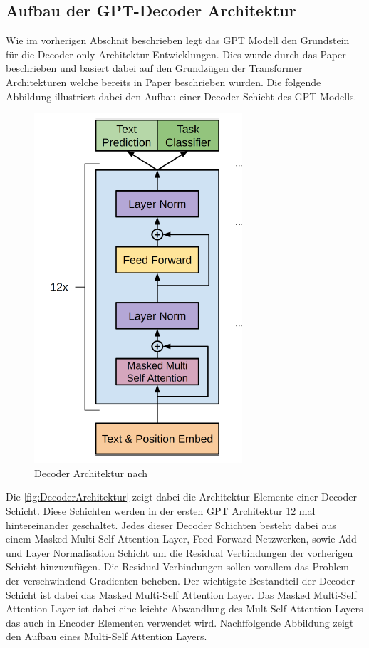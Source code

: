 \documentclass[conference]{IEEEtran}
\begin{document}
\subsection{Aufbau der GPT-Decoder Architektur}
Wie im vorherigen Abschnit beschrieben legt das GPT Modell den Grundstein für die Decoder-only Architektur Entwicklungen. Dies wurde durch das Paper \cite{radfordImprovingLanguageUnderstanding} beschrieben und basiert dabei auf den Grundzügen der Transformer Architekturen welche bereits in Paper \cite{vaswaniAttentionAllYou2023} beschrieben wurden. Die 
folgende Abbildung illustriert dabei den Aufbau einer Decoder Schicht des GPT Modells.
\begin{figure}[htbp]
    \centerline{\includegraphics[width=0.4\linewidth]{Bilder/DecoderArchitekturGPT.png}}
    \caption{Decoder Architektur nach \cite{radfordImprovingLanguageUnderstanding}}
    \label{fig:DecoderArchitektur}
\end{figure}
Die \autoref{fig:DecoderArchitektur} zeigt dabei die Architektur Elemente einer Decoder Schicht. Diese Schichten werden in der ersten GPT Architektur 12 mal hintereinander geschaltet. Jedes dieser Decoder Schichten besteht dabei aus einem Masked Multi-Self Attention Layer, Feed Forward Netzwerken, sowie Add und Layer Normalisation Schicht um die Residual Verbindungen der vorherigen Schicht hinzuzufügen. Die Residual Verbindungen sollen vorallem das Problem der verschwindend Gradienten beheben. Der wichtigste Bestandteil der Decoder Schicht ist dabei das Masked Multi-Self Attention Layer. Das Masked Multi-Self Attention Layer ist dabei eine leichte Abwandlung des Mult Self Attention Layers das auch in Encoder Elementen verwendet wird. Nachffolgende Abbildung zeigt den Aufbau eines Multi-Self Attention Layers.
\end{document}
